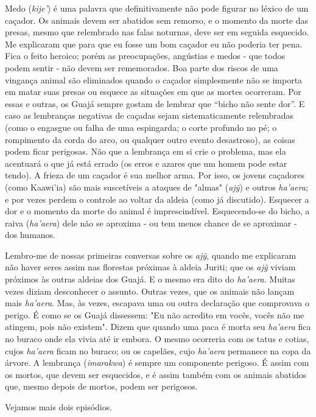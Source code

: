 Medo (\emph{kije'}) é uma palavra que definitivamente não pode figurar
no léxico de um caçador. Os animais devem ser abatidos sem remorso, e o
momento da morte das presas, mesmo que relembrado nas falas noturnas,
deve ser em seguida esquecido. Me explicaram que para que eu fosse um
bom caçador eu não poderia ter pena. Fica o feito heroico; porém as
preocupações, angústias e medos - que todos podem sentir - não devem ser
rememorados. Boa parte dos riscos de uma vingança animal são eliminados
quando o caçador simplesmente não se importa em matar suas presas ou
esquece as situações em que as mortes ocorreram. Por essas e outras, os
Guajá sempre gostam de lembrar que ``bicho não sente dor''. E caso as
lembranças negativas de caçadas sejam sistematicamente relembradas (como
o engasgue ou falha de uma espingarda; o corte profundo no pé; o
rompimento da corda do arco, ou qualquer outro evento desastroso), as
coisas podem ficar perigosas. Não que a lembrança em si crie o problema,
mas ela acentuará o que já está errado (os erros e azares que um homem
pode estar tendo). A frieza de um caçador é sua melhor arma. Por isso,
os jovens caçadores (como Kaawi'ia) são mais suscetíveis a ataques de
"almas" (\emph{ajỹ}) e outros \emph{ha'aera}; e por vezes perdem o
controle ao voltar da aldeia (como já discutido). Esquecer a dor e o
momento da morte do animal é imprescindível. Esquecendo-se do bicho, a
raiva (\emph{ha'aera}) dele não se aproxima - ou tem menos chance de se
aproximar - dos humanos.

Lembro-me de nossas primeiras conversas sobre os \emph{ajỹ}, quando me
explicaram não haver seres assim nas florestas próximas à aldeia Juriti;
que os \emph{ajỹ} viviam próximos às outras aldeias dos Guajá. E o mesmo
era dito do \emph{ha'aera}. Muitas vezes diziam desconhecer o assunto.
Outras vezes, que os animais não lançam mais \emph{ha'aera}. Mas, às
vezes, escapava uma ou outra declaração que comprovava o perigo. É como
se os Guajá dissessem: "Eu não acredito em vocês, vocês não me atingem,
pois não existem". Dizem que quando uma paca é morta seu \emph{ha'aera}
fica no buraco onde ela vivia até ir embora. O mesmo ocorreria com os
tatus e cotias, cujos \emph{ha'aera} ficam no buraco; ou os capelães,
cujo \emph{ha'aera} permanece na copa da árvore. A lembrança
(\emph{imarakwa}) é sempre um componente perigoso. É assim com os
mortos, que devem ser esquecidos, e é assim também com os animais
abatidos que, mesmo depois de mortos, podem ser perigosos.

Vejamos mais dois episódios.

